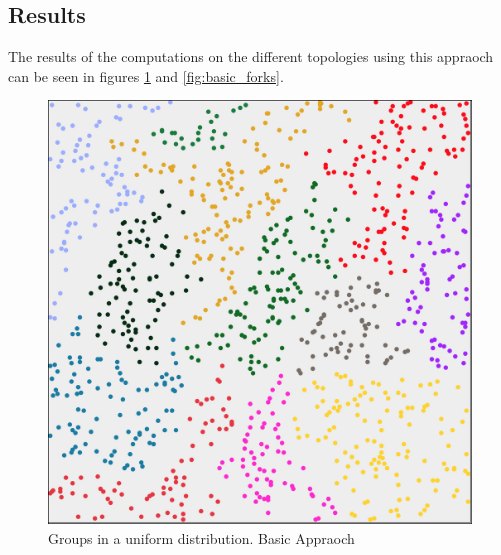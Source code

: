 \subsection{Results}
The results of the computations on the different topologies using this appraoch can be seen in figures \ref{fig:basic_uniform} and  \ref{fig:basic_forks}.
 
\begin{figure}[H]
	\center
	\includegraphics[scale=0.34]{Images/computations/BASIC500x500_1000n.jpg}
	\caption{Groups in a uniform distribution. Basic Appraoch}
	\label{fig:basic_uniform}
\end{figure}

